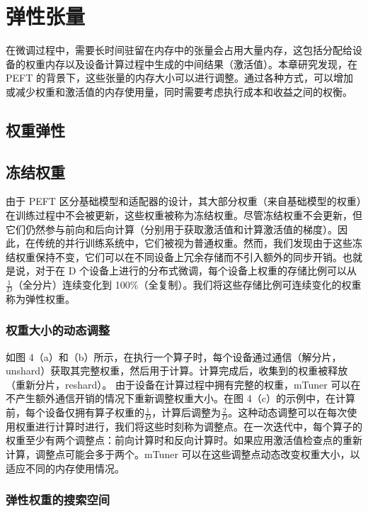 \section{弹性张量}
\label{mtuner:sec:elastic-tensor}

在微调过程中，需要长时间驻留在内存中的张量会占用大量内存，这包括分配给设备的权重内存以及设备计算过程中生成的中间结果（激活值）。本章研究发现，在 PEFT 的背景下，这些张量的内存大小可以进行调整。通过各种方式，可以增加或减少权重和激活值的内存使用量，同时需要考虑执行成本和收益之间的权衡。

\subsection{权重弹性}

\subsection{冻结权重}

由于 PEFT 区分基础模型和适配器的设计，其大部分权重（来自基础模型的权重）在训练过程中不会被更新，这些权重被称为冻结权重。尽管冻结权重不会更新，但它们仍然参与前向和后向计算（分别用于获取激活值和计算激活值的梯度）。因此，在传统的并行训练系统中，它们被视为普通权重。然而，我们发现由于这些冻结权重保持不变，它们可以在不同设备上冗余存储而不引入额外的同步开销。也就是说，对于在 D 个设备上进行的分布式微调，每个设备上权重的存储比例可以从\(\frac{1}{D}\)（全分片）连续变化到 100\%（全复制）。我们将这些存储比例可连续变化的权重称为弹性权重。

\subsubsection{权重大小的动态调整}

如图 4（a）和（b）所示，在执行一个算子时，每个设备通过通信（解分片，unshard）获取其完整权重，然后用于计算。计算完成后，收集到的权重被释放（重新分片，reshard）。
由于设备在计算过程中拥有完整的权重，mTuner 可以在不产生额外通信开销的情况下重新调整权重大小。在图 4（c）的示例中，在计算前，每个设备仅拥有算子权重的\(\frac{1}{D}\)，计算后调整为\(\frac{2}{D}\)。这种动态调整可以在每次使用权重进行计算时进行，我们将这些时刻称为调整点。在一次迭代中，每个算子的权重至少有两个调整点：前向计算时和反向计算时。如果应用激活值检查点的重新计算，调整点可能会多于两个。mTuner 可以在这些调整点动态改变权重大小，以适应不同的内存使用情况。

\subsubsection{弹性权重的搜索空间}

